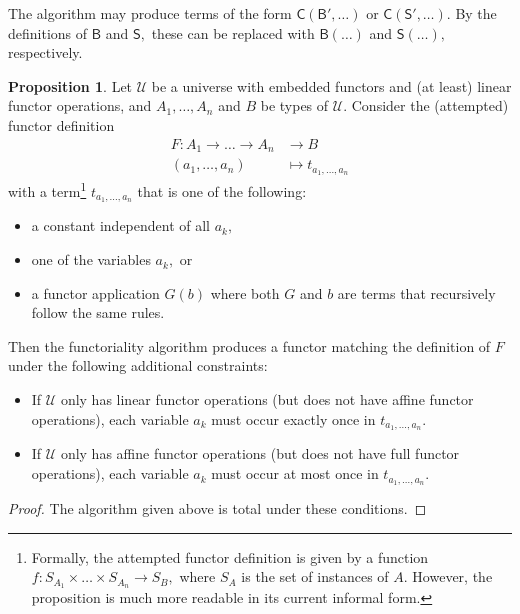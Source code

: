 \documentclass[a4paper]{article}
\theoremstyle{definition}
\newtheorem{proposition}[definition]{Proposition}
\theoremstyle{remark}
\newcommand{\U}{\mathcal{U}}
\newcommand{\nm}{\mathsf}
\newcommand{\combinator}{\nm}
\newcommand{\compFun}{\combinator{B'}}
\newcommand{\revCompFun}{\combinator{B}}
\newcommand{\swapFun}{\combinator{C}}
\newcommand{\substFun}{\combinator{S'}}
\newcommand{\revSubstFun}{\combinator{S}}
\begin{document}
The algorithm may produce terms of the form $\swapFun(\compFun,\ldots)$ or
$\swapFun(\substFun,\ldots).$ By the definitions of $\revCompFun$ and $\revSubstFun,$
these can be replaced with $\revCompFun(\ldots)$ and $\revSubstFun(\ldots),$
respectively.

\begin{proposition}
  \label{prp:functoriality}
  Let $\U$ be a universe with embedded functors and (at least) linear functor
  operations, and $A_1,\ldots,A_n$ and $B$ be types of $\U.$ Consider the (attempted)
  functor definition
  \begin{align*}
    F : A_1 \to \ldots \to A_n &\to     B\\
        (a_1,\ldots,a_n)       &\mapsto t_{a_1,\ldots,a_n}
  \end{align*}
  with a term\footnote{Formally, the attempted functor definition is given by a
  function $f : S_{A_1} \times \ldots \times S_{A_n} \to S_B,$ where $S_A$ is the
  set of instances of $A.$ However, the proposition is much more readable in its
  current informal form.} $t_{a_1,\ldots,a_n}$ that is one of the following:
  \begin{itemize}
    \item a constant independent of all $a_k,$
    \item one of the variables $a_k,$ or
    \item a functor application $G(b)$ where both $G$ and $b$ are terms that
    recursively follow the same rules.
  \end{itemize}
  Then the functoriality algorithm produces a functor matching the definition of $F$
  under the following additional constraints:
  \begin{itemize}
    \item If $\U$ only has linear functor operations (but does not have affine
    functor operations), each variable $a_k$ must occur exactly once in $t_{a_1,\ldots,a_n}.$
    \item If $\U$ only has affine functor operations (but does not have full
    functor operations), each variable $a_k$ must occur at most once in $t_{a_1,\ldots,a_n}.$
  \end{itemize}
\end{proposition}

\begin{proof}
  The algorithm given above is total under these conditions.
\end{proof}
\end{document}
